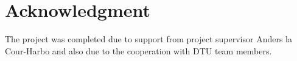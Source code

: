 \section*{Acknowledgment}
The project was completed due to support from project supervisor Anders la Cour-Harbo and also due to the cooperation with DTU team members.